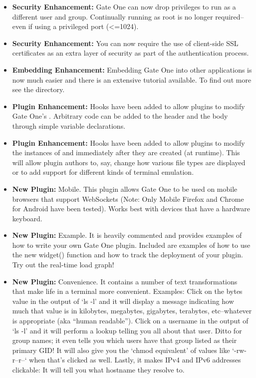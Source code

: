 \documentclass[letterpaper,10pt,openany]{sphinxmanual}
\begin{document}
\begin{itemize}
\item {} 
\textbf{Security Enhancement:}  Gate One can now drop privileges to run as a different user and group.  Continually running as root is no longer required--even if using a privileged port (\textless{}=1024).

\item {} 
\textbf{Security Enhancement:}  You can now require the use of client-side SSL certificates as an extra layer of security as part of the authentication process.

\item {} 
\textbf{Embedding Enhancement:}  Embedding Gate One into other applications is now much easier and there is an extensive tutorial available.  To find out more see the  directory.

\item {} 
\textbf{Plugin Enhancement:}  Hooks have been added to allow plugins to modify Gate One's .  Arbitrary code can be added to the header and the body through simple variable declarations.

\item {} 
\textbf{Plugin Enhancement:}  Hooks have been added to allow plugins to modify the instances of  and  immediately after they are created (at runtime).  This will allow plugin authors to, say, change how various file types are displayed or to add support for different kinds of terminal emulation.

\item {} 
\textbf{New Plugin:}  Mobile.  This plugin allows Gate One to be used on mobile browsers that support WebSockets (Note: Only Mobile Firefox and Chrome for Android have been tested).  Works best with devices that have a hardware keyboard.

\item {} 
\textbf{New Plugin:}  Example.  It is heavily commented and provides examples of how to write your own Gate One plugin.  Included are examples of how to use the new widget() function and how to track the deployment of your plugin.  Try out the real-time load graph!

\item {} 
\textbf{New Plugin:}  Convenience.  It contains a number of text transformations that make life in a terminal more convenient.  Examples:  Click on the bytes value in the output of `ls -l' and it will display a message indicating how much that value is in kilobytes, megabytes, gigabytes, terabytes, etc--whatever is appropriate (aka ``human readable'').  Click on a username in the output of `ls -l' and it will perform a lookup telling you all about that user.  Ditto for group names; it even tells you which users have that group listed as their primary GID!  It will also give you the `chmod equivalent' of values like `-rw-r--r--` when that's clicked as well.  Lastly, it makes IPv4 and IPv6 addresses clickable:  It will tell you what hostname they resolve to.


\end{itemize}
\end{document}
